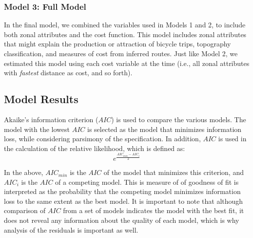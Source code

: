 \documentclass[smallextended]{svjour3}       %
\begin{document}
\hypertarget{model-3-full-model}{%
\subsubsection{Model 3: Full Model}\label{model-3-full-model}}

In the final model, we combined the variables used in Models 1 and 2, to
include both zonal attributes and the cost function. This model includes
zonal attributes that might explain the production or attraction of
bicycle trips, topography classification, and measures of cost from
inferred routes. Just like Model 2, we estimated this model using each
cost variable at the time (i.e., all zonal attributes with
\emph{fastest} distance as cost, and so forth).

\hypertarget{model-results}{%
\subsection{Model Results}\label{model-results}}

Akaike's information criterion (\(AIC\)) is used to compare the various
models. The model with the lowest \(AIC\) is selected as the model that
minimizes information loss, while considering parsimony of the
specification. In addition, \(AIC\) is used in the calculation of the
relative likelihood, which is defined as: \[
e^{\frac{AIC_{min} - AIC_i}{2}}
\]

In the above, \(AIC_{min}\) is the \(AIC\) of the model that minimizes
this criterion, and \(AIC_i\) is the \(AIC\) of a competing model. This
is measure of of goodness of fit is interpreted as the probability that
the competing model minimizes information loss to the same extent as the
best model. It is important to note that although comparison of \(AIC\)
from a set of models indicates the model with the best fit, it does not
reveal any information about the quality of each model, which is why
analysis of the residuals is important as well.
\end{document}
